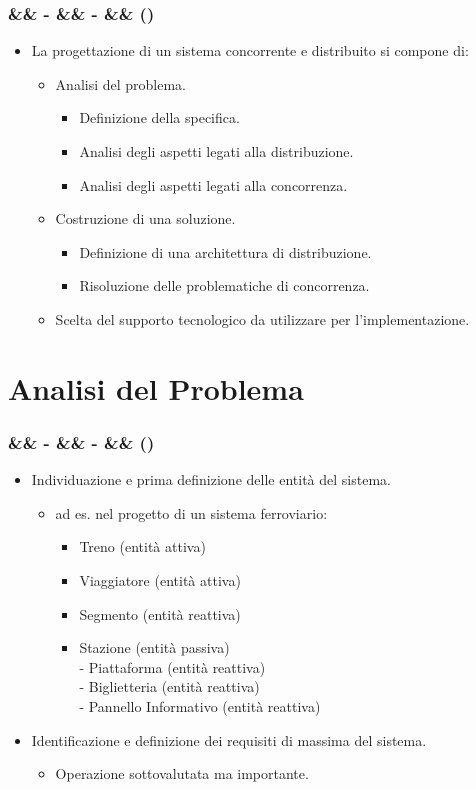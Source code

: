 \documentclass[slidestop,compress,blackandwhite]{beamer}
\newcommand{\cm}[1]{\vspace{#1cm}}
\newcommand{\newtitle}[4]{
	#1 
	\ifx&#2&%
	\else
  		\large- #2
	\fi
	\ifx&#3&%
	\else
  		\normalsize- #3
	\fi
	\ifx&#4&%
	\else
  		\normalsize (#4)
	\fi
}
\newcommand{\newframe}[5]{
	\begin{frame}
		\frametitle{\newtitle{#1}{#2}{#3}{#4}}
		#5
	\end{frame}
}
\newcommand{\myitemize}[1]{
	\begin{itemize}\itemsep4pt
	#1
	\end{itemize}
}
\begin{document}
	\newframe{}{}{}{}{
		\myitemize {
			\item La progettazione di un sistema concorrente e distribuito si compone di:
				\cm{0.2}
				\myitemize {
					\item Analisi del problema.
						\cm{0.2}
						\myitemize {
							\item Definizione della specifica.
							\item Analisi degli aspetti legati alla distribuzione.
							\item Analisi degli aspetti legati alla concorrenza.
						}
					\cm{0.2}
					\item Costruzione di una soluzione.
					\cm{0.2}	
						\myitemize {
							\item Definizione di una architettura di distribuzione.
							\item Risoluzione delle problematiche di concorrenza.
						}
					\cm{0.2}
					\item Scelta del supporto tecnologico da utilizzare per l'implementazione.
				}
		}
	}

\section{Analisi del Problema}\label{analisis}
	\newframe{}{}{}{}{
		\myitemize {
			\item Individuazione e prima definizione delle entità del sistema.
				\myitemize {
					\item ad es. nel progetto di un sistema ferroviario:
						\myitemize{
							\item Treno (entità attiva)
							\item Viaggiatore (entità attiva)
							\item Segmento (entità reattiva)
							\item Stazione (entità passiva)\\\cm{0.1}
								- Piattaforma (entità reattiva)\\ \cm{0.1}
								- Biglietteria (entità reattiva)\\ \cm{0.1}
								- Pannello Informativo (entità reattiva)
							
						}
				}
			\item Identificazione e definizione dei requisiti di massima del sistema.
				\myitemize{
					\item Operazione sottovalutata ma importante.
				}
		}
	}
	
\end{document}
